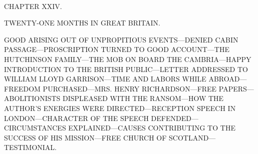 {\protect\hypertarget{365}{}{}}

~

{CHAPTER XXIV.}

TWENTY-ONE MONTHS IN GREAT BRITAIN.

{GOOD ARISING OUT OF UNPROPITIOUS EVENTS---DENIED CABIN
PASSAGE---PROSCRIPTION TURNED TO GOOD ACCOUNT---THE HUTCHINSON
FAMILY---THE MOB ON BOARD THE CAMBRIA---HAPPY INTRODUCTION TO THE
BRITISH PUBLIC---LETTER ADDRESSED TO WILLIAM LLOYD GARRISON---TIME AND
LABORS WHILE ABROAD---FREEDOM PURCHASED---MRS. HENRY RICHARDSON---FREE
PAPERS---ABOLITIONISTS DISPLEASED WITH THE RANSOM---HOW THE AUTHOR'S
ENERGIES WERE DIRECTED---RECEPTION SPEECH IN LONDON---CHARACTER OF THE
SPEECH DEFENDED---CIRCUMSTANCES EXPLAINED---CAUSES CONTRIBUTING TO THE
SUCCESS OF HIS MISSION---FREE CHURCH OF SCOTLAND---TESTIMONIAL.}


